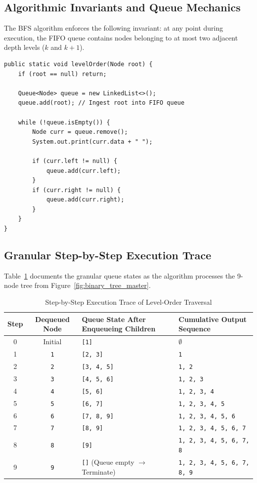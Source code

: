 \documentclass[10pt,journal,compsoc,onecolumn]{IEEEtran}
\begin{document}
\subsection{Algorithmic Invariants and Queue Mechanics}

The BFS algorithm enforces the following invariant: at any point during execution, the FIFO queue contains nodes belonging to at most two adjacent depth levels ($k$ and $k + 1$).

\begin{verbatim}
public static void levelOrder(Node root) {
    if (root == null) return;

    Queue<Node> queue = new LinkedList<>();
    queue.add(root); // Ingest root into FIFO queue

    while (!queue.isEmpty()) {
        Node curr = queue.remove();
        System.out.print(curr.data + " ");

        if (curr.left != null) {
            queue.add(curr.left);
        }
        if (curr.right != null) {
            queue.add(curr.right);
        }
    }
}
\end{verbatim}

\subsection{Granular Step-by-Step Execution Trace}

Table~\ref{tab:bfs_queue_trace} documents the granular queue states as the algorithm processes the 9-node tree from Figure~\ref{fig:binary_tree_master}.

\begin{table}[htbp]
\centering
\caption{Step-by-Step Execution Trace of Level-Order Traversal}
\label{tab:bfs_queue_trace}
\begin{tabular}{ccp{3.8cm}p{3.2cm}}
\toprule
\textbf{Step} & \textbf{Dequeued Node} & \textbf{Queue State After Enqueueing Children} & \textbf{Cumulative Output Sequence} \\
\midrule
0 & Initial & \texttt{[1]} & $\emptyset$ \\
1 & \texttt{1} & \texttt{[2, 3]} & \texttt{1} \\
2 & \texttt{2} & \texttt{[3, 4, 5]} & \texttt{1, 2} \\
3 & \texttt{3} & \texttt{[4, 5, 6]} & \texttt{1, 2, 3} \\
4 & \texttt{4} & \texttt{[5, 6]} & \texttt{1, 2, 3, 4} \\
5 & \texttt{5} & \texttt{[6, 7]} & \texttt{1, 2, 3, 4, 5} \\
6 & \texttt{6} & \texttt{[7, 8, 9]} & \texttt{1, 2, 3, 4, 5, 6} \\
7 & \texttt{7} & \texttt{[8, 9]} & \texttt{1, 2, 3, 4, 5, 6, 7} \\
8 & \texttt{8} & \texttt{[9]} & \texttt{1, 2, 3, 4, 5, 6, 7, 8} \\
9 & \texttt{9} & \texttt{[]} (Queue empty $\to$ Terminate) & \texttt{1, 2, 3, 4, 5, 6, 7, 8, 9} \\
\bottomrule
\end{tabular}
\end{table}
\end{document}

